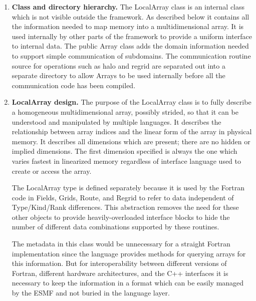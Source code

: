 

\begin{enumerate}

\item{\bf Class and directory hierarchy.}
The LocalArray class is an internal class which is not 
visible outside the framework.
As described below it contains all the information needed to
map memory into a multidimensional array.  It is used internally
by other parts of the framework to provide a uniform interface to 
internal data.  The public Array class
adds the domain information needed to support simple communication of
subdomains.  The communication routine source for operations such
as halo and regrid are separated out into a separate directory 
to allow Arrays to be used internally before all the 
communication code has been compiled.

\item{\bf LocalArray design.}
The purpose of the LocalArray class is to fully describe 
a homogeneous
multidimensional array, possibly strided, so that it can be understood
and manipulated by multiple languages.   It describes the
relationship between array indices and the linear form of the array
in physical memory.  It describes all dimensions which are present;
there are no hidden or implied dimensions.  The first dimension specified
is always the one which varies fastest in linearized memory regardless of
interface language used to create or access the array.

The LocalArray type is defined separately because it is used by the
Fortran code in Fields, Grids, Route, and Regrid to refer to data 
independent of Type/Kind/Rank differences.  This abstraction removes
the need for these other objects to provide
heavily-overloaded interface blocks to hide the number of
different data combinations supported by these routines.

The metadata in this class would be unnecessary for a straight
Fortran implementation since the language provides methods for querying
arrays for this information.  But for interoperability between different
versions of Fortran, different hardware architectures, 
and the C++ interfaces
it is necessary to keep the information in a format which can be
easily managed by the ESMF and not buried in the language layer.



\end{enumerate}
